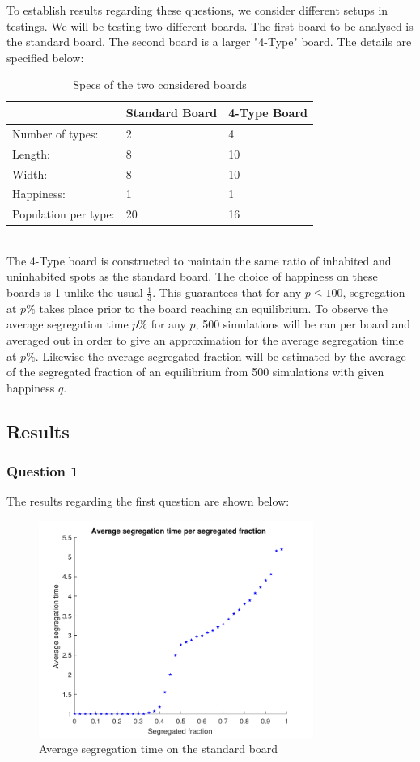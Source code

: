 To establish results regarding these questions, we consider different setups in testings. We will be testing two different boards.
The first board to be analysed is the standard board. The second board is a larger 
"4-Type" board. The details are specified below:
\begin{table}[h!]
\centering
\caption{Specs of the two considered boards}
\label{my-label}
\begin{tabular}{l|l|l}
  & Standard Board & 4-Type Board\\ \hline
Number of types:& 2 & 4 \\ 
 Length:& 8 & 10  \\
 Width:& 8 & 10  \\
 Happiness:& 1 & 1  \\
Population per type: & 20 & 16  
\end{tabular}
\end{table}
\\
The 4-Type board is constructed to maintain the same ratio of inhabited and uninhabited spots as the standard board. The choice of happiness on these boards is 1 unlike the usual \(\frac{1}{3}\). 
This guarantees that for any \(p\leq 100\), segregation at \(p\%\) takes place prior to the board reaching an equilibrium. 
To observe the average segregation time \(p\%\) for any \(p\), 500 simulations will be ran per board and averaged out in order to give an approximation for the average segregation time at \(p\%\).
Likewise the average segregated fraction will be estimated by the average of the segregated fraction of an equilibrium from 500 simulations with given happiness \(q\).
\subsection{Results}
\subsubsection{Question 1}
The results regarding the first question are shown below:\\
\begin{figure}[H]
    \centering
    \includegraphics[width=0.8\textwidth]{aveseg_sb_2}
    \caption{Average segregation time on the standard board}
    \label{fig:avesegsb}
\end{figure}

